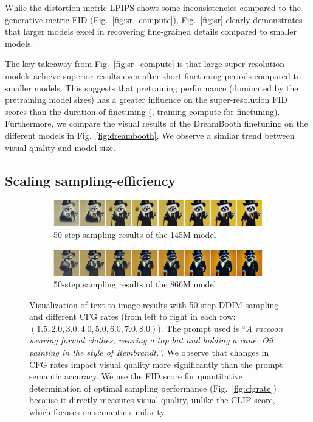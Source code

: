 While the distortion metric LPIPS shows some inconsistencies compared to the generative metric FID (Fig.~\ref{fig:sr_compute}), Fig.~\ref{fig:sr} clearly demonstrates that larger models excel in recovering fine-grained details compared to smaller models.

The key takeaway from Fig.~\ref{fig:sr_compute} is that large super-resolution models achieve superior results even after short finetuning periods compared to smaller models. This suggests that pretraining performance (dominated by the pretraining model sizes) has a greater influence on the super-resolution FID scores than the duration of finetuning (\ie, training compute for finetuning).
%
Furthermore, we compare the visual results of the DreamBooth finetuning on the different models in Fig.~\ref{fig:dreambooth}. We observe a similar trend between  visual quality and  model size.


\subsection{Scaling sampling-efficiency}
\label{sec:scalesampleeff}
\begin{figure}[ht]
    \centering
    \begin{subfigure}[b]{\linewidth}
    \includegraphics[width=\linewidth]{cp2/figures/145M_cfg.jpg}
    \caption{50-step sampling results of the 145M model}
    \end{subfigure}
    \begin{subfigure}[b]{\linewidth}
    \includegraphics[width=\linewidth]{cp2/figures/866M_cfg.jpg}
    \caption{50-step sampling results of the 866M model}
    \end{subfigure}
    \caption{Visualization of text-to-image results with 50-step DDIM sampling and different CFG rates (from left to right in each row: $(1.5, 2.0, 3.0, 4.0, 5.0, 6.0, 7.0, 8.0)$). The prompt used is ``\emph{A raccoon wearing formal clothes, wearing a top hat and holding a cane. Oil painting in the style of Rembrandt.}''.
    We observe that changes in CFG rates impact visual quality more significantly than the prompt semantic accuracy.
    We use the FID score for quantitative determination of optimal sampling performance (Fig.~\ref{fig:cfgrate}) because it directly measures visual quality, unlike the CLIP score, which focuses on semantic similarity. }
    \label{fig:cfgratevisual}
\end{figure}

